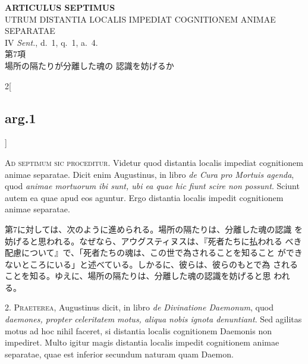 \documentclass[paper=a4paper,fontsize=10pt,jafontsize=9pt,titlepage]{jlreq}
\begin{document}
\newpage
{}

{}
\setcounter{section}{7}
\setcounter{subsection}{0}
\begin{center}
{\Large {\bfseries ARTICULUS SEPTIMUS}}\\ {\large UTRUM DISTANTIA LOCALIS
IMPEDIAT COGNITIONEM ANIMAE SEPARATAE}\\ {\footnotesize IV {\itshape
Sent.}, d.~1, q.~1, a.~4.}\\ {\Large 第7項\\場所の隔たりが分離した魂の
認識を妨げるか}
\end{center}

\begin{paracol}{2}[\subsection{arg.1}]

{\huge A}{\scshape d septimum sic proceditur}. Videtur quod distantia
localis impediat cognitionem animae separatae. Dicit enim Augustinus,
in libro {\itshape de Cura pro Mortuis agenda}, quod {\itshape animae mortuorum
ibi sunt, ubi ea quae hic fiunt scire non possunt}. Sciunt autem ea
quae apud eos aguntur. Ergo distantia localis impedit cognitionem
animae separatae.

\switchcolumn

第7に対しては、次のように進められる。場所の隔たりは、分離した魂の認識
を妨げると思われる。なぜなら、アウグスティヌスは、『死者たちに払われる
べき配慮について』で、「死者たちの魂は、この世で為されることを知ること
ができないところにいる」と述べている。しかるに、彼らは、彼らのもとで為
されることを知る。ゆえに、場所の隔たりは、分離した魂の認識を妨げると思
われる。


2. {\scshape Praeterea}, Augustinus dicit, in libro {\itshape de Divinatione
Daemonum}, quod {\itshape daemones, propter celeritatem motus, aliqua nobis
ignota denuntiant}. Sed agilitas motus ad hoc nihil faceret, si
distantia localis cognitionem Daemonis non impediret. Multo igitur
magis distantia localis impedit cognitionem animae separatae, quae est
inferior secundum naturam quam Daemon.

\switchcolumn


\end{paracol}
\end{document}
